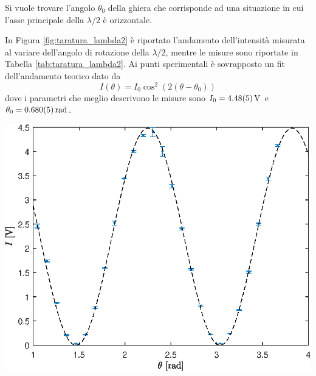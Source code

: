 \documentclass[10pt,oneside,a4paper]{article}
\newenvironment{Figure}
  {\par\medskip\noindent\minipage{\linewidth}}
  {\endminipage\par\medskip}
\begin{document}
\begin{multicols}{2}
Si vuole trovare l'angolo $\theta_0$ della ghiera che corrisponde ad una situazione in cui l'asse principale della $\lambda/2$ è orizzontale.

In Figura \ref{fig:taratura_lambda2} è riportato l'andamento dell'intensità misurata al variare dell'angolo di rotazione della $\lambda/2$, mentre le misure sono riportate in Tabella \ref{tab:taratura_lambda2}. Ai punti sperimentali è sovrapposto un fit dell'andamento teorico dato da
\begin{equation}
	I(\theta) = I_0 \cos^2\left( 2\left(\theta- \theta_0\right)\right)
\end{equation}
dove i parametri che meglio descrivono le misure sono $I_0 = \SI{4.48 \pm 0.05}{V}$ e $\theta_0 = \SI{0.680\pm0.005}{rad}$.
\begin{Figure}
	\begin{center}
	\includegraphics[width=\linewidth]{taratura_lambda2.eps}
	\label{fig:taratura_lambda2}
	\end{center}
\end{Figure}


\end{multicols}
\end{document}
